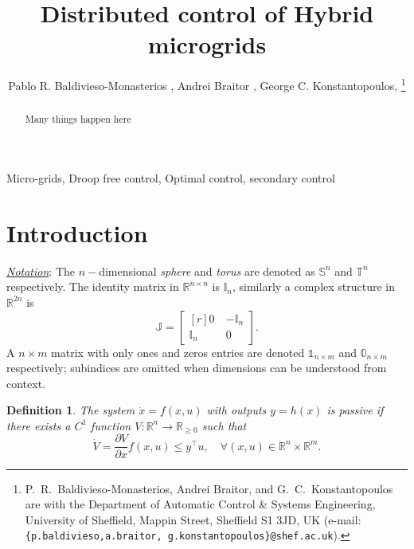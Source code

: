 \documentclass[journal, final, letterpaper]{IEEEtran}
\newtheorem{definition}{Definition}[section]
\newcommand{\ts}[1]{{\textnormal{#1}}}
\newcommand{\Rset}{\mathbb{R}}
\newcommand{\mbb}{\mathbb}
\begin{document}
\title{Distributed control of Hybrid microgrids}

\author{Pablo R. Baldivieso-Monasterios , Andrei Braitor , George C. Konstantopoulos, 
\thanks{P.~R.~Baldivieso-Monasterios, Andrei Braitor, and G.~C.~Konstantopoulos are with the Department of Automatic Control \& Systems Engineering,
      University of Sheffield, Mappin Street, Sheffield S1 3JD, UK
      (e-mail: \texttt{\{p.baldivieso,a.braitor, g.konstantopoulos\}@shef.ac.uk}).}}


\maketitle

\begin{abstract}
Many things happen here
\end{abstract}
%
\begin{IEEEkeywords}
Micro-grids, Droop free control, Optimal control, secondary control
\end{IEEEkeywords}
%
\section{Introduction}
\label{sec:introduction}

\underline{\emph{Notation}}: The $n-$dimensional \emph{sphere} and \emph{torus} are denoted as $\mbb{S}^n$ and $\mbb{T}^{n}$ respectively. The identity matrix in $\Rset^{n\times n}$ is $\mbb{I}_n$, similarly a complex structure in $\Rset^{2n}$ is \[\mbb{J} =
  \begin{bmatrix*}[r]
    0~ &-\mbb{I}_n \\
    \mbb{I}_n & 0~ 
  \end{bmatrix*}
  .\]A $n\times m$ matrix with only ones and zeros entries are denoted $\mbb{1}_{n\times m}$ and $\mbb{0}_{n\times m}$ respectively; subindices are omitted when dimensions can be understood from context.   
\begin{definition}
The system $\dot{x} = f(x,u)$ with outputs $y = h(x)$ is passive if there exists a $C^{1}$ function $V:\Rset^n\to\Rset_{\geq0}$ such that
%
\begin{equation*}
 \dot{V} = \frac{\partial V}{\partial x}f(x,u) \leq y^\top u,\quad \forall (x,u)\in\Rset^{n}\times\Rset^{m}.
\end{equation*}
% 
\label{def:passivity}	
\end{definition}
\end{document}
